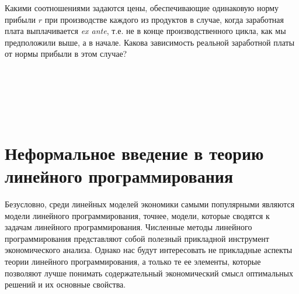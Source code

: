 \begin{exer}
    Какими соотношениями задаются цены,
    обеспечивающие одинаковую норму прибыли $r$ при производстве
    каждого из продуктов в случае, когда заработная плата
    выплачивается \emph{ex ante}, т.е. не в конце производственного
    цикла, как мы предположили выше, а в начале. Какова зависимость
    реальной заработной платы от нормы прибыли в этом случае?
\end{exer}























































\











\


\


\section{Неформальное введение в теорию линейного программирования}

    Безусловно, среди линейных моделей экономики самыми популярными
    являются модели линейного программирования, точнее, модели,
    которые сводятся к задачам линейного программирования. Численные
    методы линейного программирования представляют собой полезный
    прикладной инструмент экономического анализа. Однако нас
    будут интересовать не прикладные аспекты теории линейного
    программирования, а только те ее элементы, которые
    позволяют лучше понимать содержательный экономический смысл
    оптимальных решений и их основные свойства.


